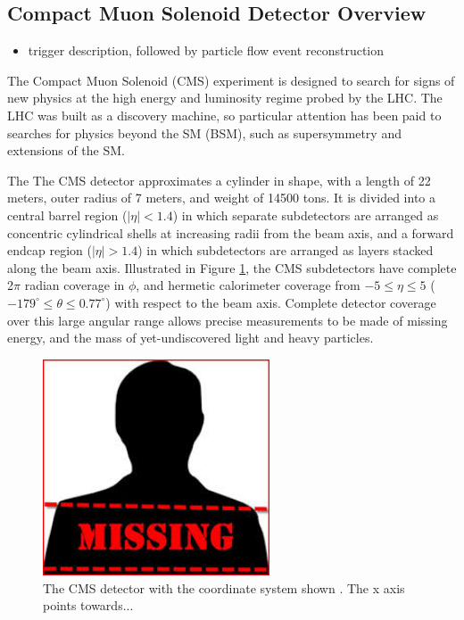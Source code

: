 \subsection{Compact Muon Solenoid Detector Overview}
\begin{itemize}
	\item trigger description, followed by particle flow event reconstruction
\end{itemize}
The Compact Muon Solenoid (CMS) experiment is designed to search for signs of new physics at the high energy and luminosity regime probed by the LHC.  The LHC was built
as a discovery machine, so particular attention has been paid to searches for physics beyond the SM (BSM), such as supersymmetry and extensions of the SM.

The The CMS detector approximates a cylinder in shape, with a length of 22 meters, outer radius of 7 meters, and weight of 14500 tons.  It is divided into a central barrel region ($|\eta| < 1.4$)
in which separate subdetectors are arranged as concentric cylindrical shells at increasing radii from the beam axis, and a forward endcap region ($|\eta| > 1.4$) 
in which subdetectors are arranged as layers stacked along the beam axis.  Illustrated in Figure \ref{fig:cmsDetectorComponentView}, the CMS subdetectors have complete 2$\pi$ radian coverage in
$\phi$, and hermetic calorimeter coverage from $-5 \leq \eta \leq 5$ ($-179^{\circ} \leq \theta \leq 0.77^{\circ}$) with respect to the beam axis.  Complete detector
coverage over this large angular range allows precise measurements to be made of missing energy, and the mass of yet-undiscovered light and heavy particles.

\begin{figure}[h]
	\centering
	\includegraphics[width=0.6\textwidth]{figures/missingImage.png}
	\caption{The CMS detector with the coordinate system shown   .  The x axis points towards...}
	\label{fig:cmsDetectorComponentView}
\end{figure}


